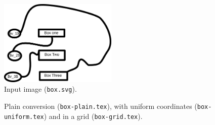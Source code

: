 \begin{figure}[H]
\centering
\includegraphics[width=0.5\textwidth]{box.pdf}
\caption{Input image (\texttt{box.svg}).}
\end{figure}

\begin{figure}[H]
\begin{minipage}{0.3\textwidth}
\begin{tikzpicture}

\end{tikzpicture}
\end{minipage}
\begin{minipage}{0.3\textwidth}
\begin{tikzpicture}

\end{tikzpicture}
\end{minipage}
\begin{minipage}{0.3\textwidth}
\begin{tikzpicture}

\end{tikzpicture}
\end{minipage}
\caption{Plain conversion (\texttt{box-plain.tex}), with uniform coordinates (\texttt{box-uniform.tex}) and in a grid (\texttt{box-grid.tex}).}
\end{figure}
